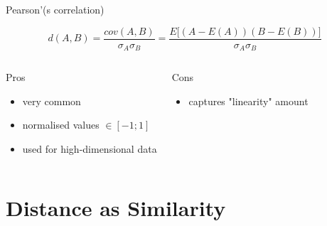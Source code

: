 \documentclass{beamer}
\begin{document}
\begin{frame}{Pearson'(s correlation)}


$$d(A,B)= \frac{cov(A,B)}{\sigma_A\sigma_B}=\frac{E\big[(A-E(A))(B-E(B))  \big]}{\sigma_A\sigma_B}$$ 



\begin{scriptsize}
\begin{columns}[T,onlytextwidth]
\begin{block}{Pros}
\begin{itemize}
  \item very common
  \item normalised values $\in [-1;1]$
  \item used for high-dimensional data
\end{itemize}
\end{block}
\begin{block}{Cons}
\begin{spacing}{0.9}
\begin{itemize}
  \item captures "linearity" amount
  \end{itemize}
\end{spacing}
\end{block}
\end{columns}
\end{scriptsize}

\end{frame}


\section{Distance as Similarity}
\end{document}
